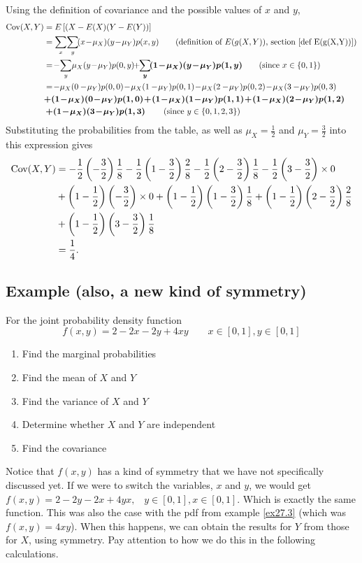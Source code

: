 \solution
Using the definition of covariance and the possible values of $x$ and $y$,
\begin{align*}
\Cov(X,Y) & = E\squac{(X - E(X)(Y - E(Y))} \\
	& = \sum_x\!\sum_y\!(x\! -\! \mu_X)(y\! -\! \mu_Y)p(x,y) \tag{definition of $E(g(X,Y))$, section \ref{def E(g(X,Y))}} \\
	& =\! -\! \sum_y\! \mu_X(y\! -\! \mu_Y)p(0,y)\!\! +\!\! \boldsymbol{\sum_y\! (1\! -\! \mu_X)(y\! -\! \mu_Y)p(1,y)} \tag{since $x \in \set{0,1}$} \\
	& =\! - \mu_X(0 -\! \mu_Y)p(0,0) \! -\! \mu_X(1 -\! \mu_Y)p(0,1) \! -\! \mu_X(2 -\! \mu_Y)p(0,2) \! -\! \mu_X(3 -\! \mu_Y)p(0,3) \\
	& \boldsymbol{+ (1 \! - \! \mu_X)(0 \! - \! \mu_Y)p(1,0) \! + \! (1 \! - \! \mu_X)(1 \! -\! \mu_Y)p(1,1) \! + \! (1 \! - \! \mu_X)(2 \! -\! \mu_Y)p(1,2) \!} \\
	 & \boldsymbol{ +(1 \! - \! \mu_X)(3\! -\! \mu_Y)p(1,3)} \tag{since $y \in \set{0,1,2,3}$}
\end{align*}
Substituting the probabilities from the table, as well as $\mu_X = \frac{1}{2}$ and $\mu_Y = \frac{3}{2}$ into this expression gives
\begin{align*}
\text{Cov}(X,Y) & = -\frac{1}{2}\left(-\frac{3}{2}\right)\frac{1}{8} - \frac{1}{2}\left(1-\frac{3}{2}\right)\frac{2}{8} - \frac{1}{2}\left(2-\frac{3}{2}\right)\frac{1}{8} - \frac{1}{2}\left(3 - \frac{3}{2}\right)\times 0 \\
	& + \left(1-\frac{1}{2}\right)\left(-\frac{3}{2}\right)\times 0 + \left(1 - \frac{1}{2}\right)\left(1 - \frac{3}{2}\right)\frac{1}{8} + \left(1 - \frac{1}{2}\right)\left(2 - \frac{3}{2}\right)\frac{2}{8} \\
	& + \left(1 - \frac{1}{2}\right)\left(3 - \frac{3}{2}\right)\frac{1}{8} \\
	& = \frac{1}{4}.
\end{align*}

\subsection{Example (also, a new kind of symmetry)}
For the joint probability density function
\[
f(x,y) = 2 - 2x - 2y + 4xy \qquad x \in [0,1], y \in [0,1] \tag{$f(x,y) = 0$ otherwise}
\]
\begin{enumerate}
\item Find the marginal probabilities
\item Find the mean of $X$ and $Y$
\item Find the variance of $X$ and $Y$
\item Determine whether $X$ and $Y$ are independent
\item Find the covariance
\end{enumerate}
Notice that $f(x,y)$ has a kind of symmetry that we have not specifically discussed yet. If we were to switch the variables, $x$ and $y$, we would get $f(x,y) = 2 - 2y - 2x + 4yx, \;\;\; y \in [0,1], x \in [0,1]$. Which is exactly the same function. This was also the case with the pdf from example \ref{ex27.3} (which was $f(x,y) = 4xy$). When this happens, we can obtain the results for $Y$ from those for $X$, using symmetry. Pay attention to how we do this in the following calculations.  \\

